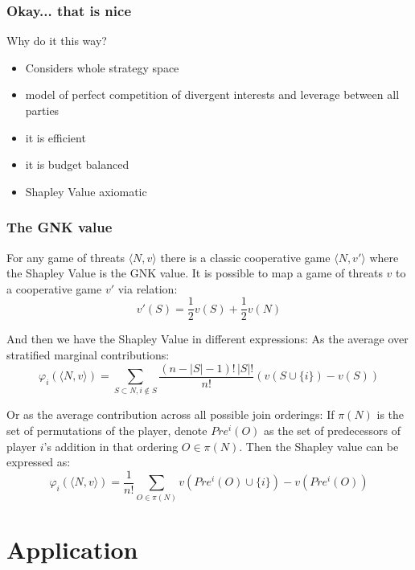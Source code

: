 \begin{frame}
\frametitle{Okay... that is nice}
Why do it this way?

\begin{itemize}
\item	Considers whole strategy space
\item	model of perfect competition of divergent interests and leverage between all parties
\item	it is efficient
\item	it is budget balanced
\item	Shapley Value axiomatic
\end{itemize}
\end{frame}


\begin{frame}
\frametitle{The GNK value}
For any game of threats $\langle N,v\rangle$ there is a classic cooperative game $\langle N,v'\rangle$ where the Shapley Value is the GNK value.
It is possible to map a game of threats $v$ to a cooperative game $v'$ via relation:
\begin{equation}\label{convert1}
v'(S)=\frac{1}{2}v(S)+\frac{1}{2}v(N)
\end{equation}

And then we have the Shapley Value in different expressions: As the average over stratified marginal contributions:
\begin{equation}\label{shap1_X}\varphi_i(\langle N,v\rangle) = \sum_{S\subset N, i\notin S}\frac{(n-|S|-1)!\,|S|!}{n!}(v(S\cup\{i\})-v(S))\end{equation}

Or as the average contribution across all possible join orderings:
If $\pi(N)$ is the set of permutations of the player, denote $Pre^i(O)$ as the set of predecessors of player $i$'s addition in that ordering $O\in \pi(N)$. Then the Shapley value can be expressed as:
\begin{equation}\label{shapley_value3}
    \varphi_i(\langle N,v\rangle) = \frac{1}{n!}\sum_{O\in\pi(N)}v(Pre^i(O)\cup\{i\})-v(Pre^i(O))
\end{equation}
\end{frame}



\section{Application}

